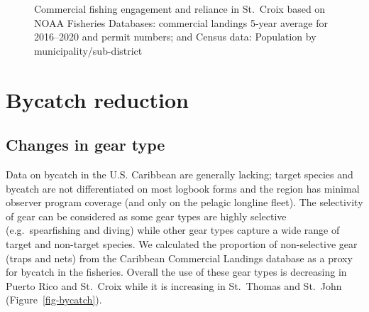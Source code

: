 \documentclass[
  letterpaper,
  oneside,
  open=any]{scrbook}
\begin{document}
\begin{figure}


\caption{\label{fig-USVIengage}Commercial fishing engagement and
reliance in St.~Croix based on NOAA Fisheries Databases: commercial
landings 5-year average for 2016--2020 and permit numbers; and Census
data: Population by municipality/sub-district}

\end{figure}%

\section{Bycatch reduction}\label{bycatch-reduction}

\subsection{Changes in gear type}\label{changes-in-gear-type}

Data on bycatch in the U.S. Caribbean are generally lacking; target
species and bycatch are not differentiated on most logbook forms and the
region has minimal observer program coverage (and only on the pelagic
longline fleet). The selectivity of gear can be considered as some gear
types are highly selective (e.g.~spearfishing and diving) while other
gear types capture a wide range of target and non-target species. We
calculated the proportion of non-selective gear (traps and nets) from
the Caribbean Commercial Landings database as a proxy for bycatch in the
fisheries. Overall the use of these gear types is decreasing in Puerto
Rico and St.~Croix while it is increasing in St.~Thomas and St.~John
(Figure~\ref{fig-bycatch}).
\end{document}
